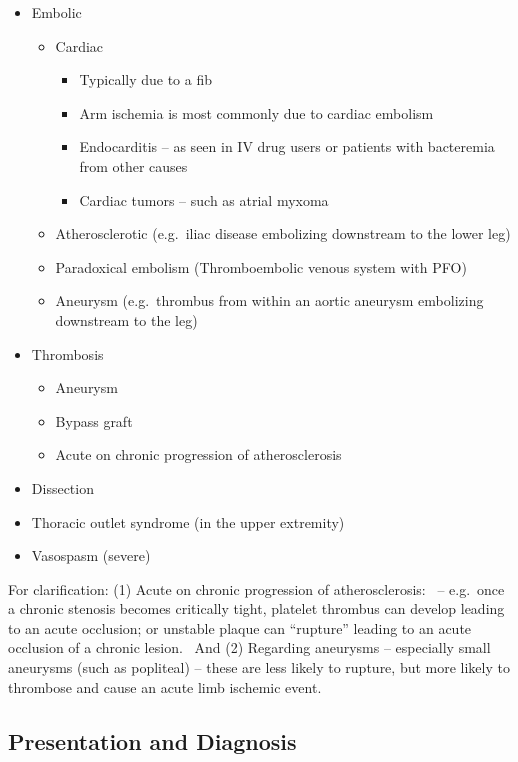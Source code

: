 \documentclass[
]{book}
\begin{document}
\begin{itemize}
\item
  Embolic

  \begin{itemize}
  \item
    Cardiac

    \begin{itemize}
    \item
      Typically due to a fib
    \item
      Arm ischemia is most commonly due to cardiac embolism~
    \item
      Endocarditis -- as seen in IV drug users or patients with
      bacteremia from other causes
    \item
      Cardiac tumors -- such as atrial myxoma
    \end{itemize}
  \item
    Atherosclerotic (e.g.~iliac disease embolizing downstream to the
    lower leg)
  \item
    Paradoxical embolism (Thromboembolic venous system with PFO)~
  \item
    Aneurysm (e.g.~thrombus from within an aortic aneurysm
    embolizing downstream to the leg)
  \end{itemize}
\item
  Thrombosis

  \begin{itemize}
  \item
    Aneurysm
  \item
    Bypass graft
  \item
    Acute on chronic progression of atherosclerosis
  \end{itemize}
\item
  Dissection
\item
  Thoracic outlet syndrome (in the upper extremity)
\item
  Vasospasm (severe)
\end{itemize}

For clarification: (1) Acute on chronic progression of atherosclerosis:~
-- e.g.~once a chronic stenosis becomes critically tight, platelet
thrombus can develop leading to an acute occlusion; or unstable plaque
can ``rupture'' leading to an acute occlusion of a chronic lesion.~ And
(2) Regarding aneurysms -- especially small aneurysms (such as
popliteal) -- these are less likely to rupture, but more likely to
thrombose and cause an acute limb ischemic event.

\hypertarget{presentation-and-diagnosis-1}{%
\subsection{Presentation and Diagnosis}\label{presentation-and-diagnosis-1}}
\end{document}
